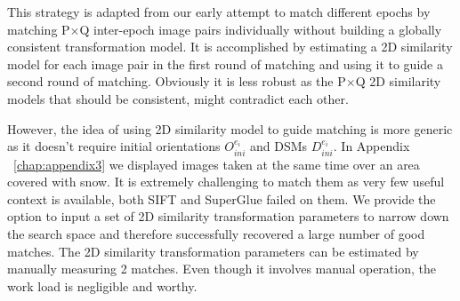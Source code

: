 This strategy is adapted from our early attempt to match different epochs by matching P$\times$Q inter-epoch image pairs individually without building a globally consistent transformation model. It is accomplished by estimating a 2D similarity model for each image pair in the first round of matching and using it to guide a second round of matching. Obviously it is less robust as the P$\times$Q 2D similarity models that should be consistent, might contradict each other.
\par
However, the idea of using 2D similarity model to guide matching is more generic as it doesn't require initial orientations $O_{ini}^{e_i}$ and DSMs $D_{ini}^{e_i}$. In Appendix ~\ref{chap:appendix3} we displayed images taken at the same time over an area covered with snow. It is extremely challenging to match them as very few useful context is available, both SIFT and SuperGlue failed on them. We provide the option to input a set of 2D similarity transformation parameters to narrow down the search space and therefore successfully recovered a large number of good matches. The 2D similarity transformation parameters can be estimated by manually measuring 2 matches. Even though it involves manual operation, the work load is negligible and worthy.


